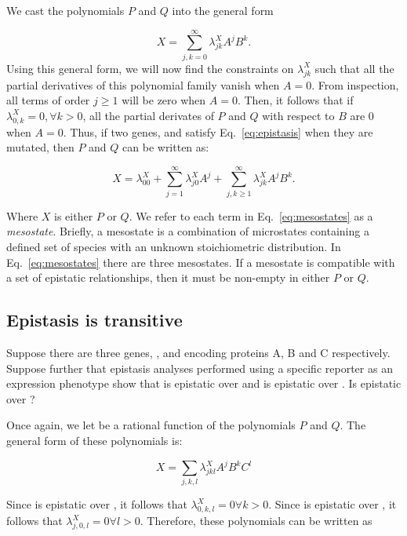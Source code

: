 We cast the polynomials \(P\) and \(Q\) into the general form

\begin{equation*}
    X = \sum_{j, k=0}^\infty \lambda^X_{jk} A^j B^k.
\end{equation*}
Using this general form, we will now find the constraints on \(\lambda^X_{jk}\)
such that all the partial derivatives of this polynomial family vanish when
\(A=0\). From inspection, all terms of order \(j \geq 1\) will be zero when
\(A =0\). Then, it follows that if \(\lambda^X_{0,k} = 0, \forall k>0\), all the
partial derivates of \(P\) and \(Q\) with respect to \(B\) are 0 when \(A=0\).
Thus, if two genes,  and  satisfy Eq.~\ref{eq:epistasis} when
they are mutated, then \(P\) and \(Q\) can be written as:

\begin{equation}
  X = \lambda^X_{00} + \sum_{j = 1}^\infty \lambda^X_{j0} A^j +
                       \sum_{j, k \geq 1}^\infty \lambda^X_{jk} A^j B^k.
\label{eq:mesostates}
\end{equation}

Where \(X\) is either \(P\) or \(Q\). We refer to each term in
Eq.~\ref{eq:mesostates} as a \emph{mesostate}. Briefly, a mesostate is a
combination of microstates containing a defined set of species with an unknown
stoichiometric distribution. In Eq.~\ref{eq:mesostates} there are three
mesostates. If a mesostate is compatible with a set of epistatic relationships,
then it must be non-empty in either \(P\) or \(Q\).

\subsection{Epistasis is transitive}
Suppose there are three genes, ,  and  encoding proteins
A, B and C respectively. Suppose further that epistasis analyses performed using
a specific reporter as an expression phenotype show that  is epistatic
over  and  is epistatic over . Is  epistatic
over ?

Once again, we let \Freg{} be a rational function of the polynomials \(P\) and
\(Q\). The general form of these polynomials is:

\begin{equation*}
    X = \sum_{j, k, l} \lambda^X_{jkl} A^j B^k C^l
\end{equation*}

Since  is epistatic over , it follows that
\(\lambda^X_{0, k, l} = 0\forall k > 0\). Since  is epistatic over ,
it follows that \(\lambda^X_{j, 0, l} = 0 \forall l>0\). Therefore, these
polynomials can be written as

